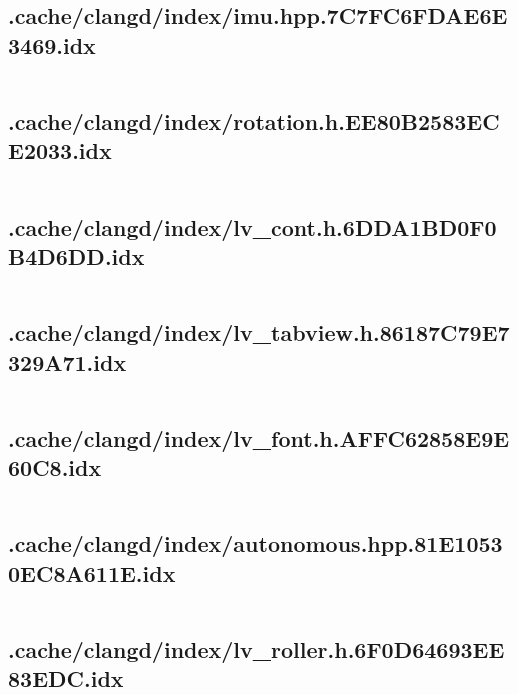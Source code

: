 \subsection{.cache/clangd/index/imu.hpp.7C7FC6FDAE6E3469.idx}
\inputminted[linenos,tabsize=2,breaklines, breakanywhere]{c}{imu.hpp.7C7FC6FDAE6E3469.idx}
\pagebreak

\subsection{.cache/clangd/index/rotation.h.EE80B2583ECE2033.idx}
\inputminted[linenos,tabsize=2,breaklines, breakanywhere]{c}{rotation.h.EE80B2583ECE2033.idx}
\pagebreak

\subsection{.cache/clangd/index/lv_cont.h.6DDA1BD0F0B4D6DD.idx}
\inputminted[linenos,tabsize=2,breaklines, breakanywhere]{c}{lv_cont.h.6DDA1BD0F0B4D6DD.idx}
\pagebreak

\subsection{.cache/clangd/index/lv_tabview.h.86187C79E7329A71.idx}
\inputminted[linenos,tabsize=2,breaklines, breakanywhere]{c}{lv_tabview.h.86187C79E7329A71.idx}
\pagebreak

\subsection{.cache/clangd/index/lv_font.h.AFFC62858E9E60C8.idx}
\inputminted[linenos,tabsize=2,breaklines, breakanywhere]{c}{lv_font.h.AFFC62858E9E60C8.idx}
\pagebreak

\subsection{.cache/clangd/index/autonomous.hpp.81E10530EC8A611E.idx}
\inputminted[linenos,tabsize=2,breaklines, breakanywhere]{c}{autonomous.hpp.81E10530EC8A611E.idx}
\pagebreak

\subsection{.cache/clangd/index/lv_roller.h.6F0D64693EE83EDC.idx}
\inputminted[linenos,tabsize=2,breaklines, breakanywhere]{c}{lv_roller.h.6F0D64693EE83EDC.idx}
\pagebreak

